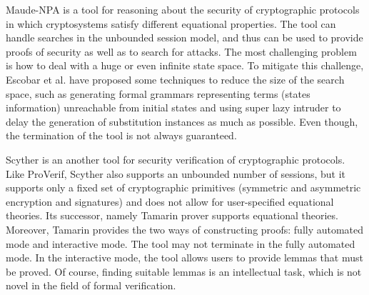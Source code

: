 \documentclass[a4paper,fleqn]{cas-dc}
\begin{document}
Maude-NPA \cite{maudenpa} is a tool for reasoning about the security of cryptographic protocols in which cryptosystems satisfy different equational properties.
The tool can handle searches in the unbounded session model, and thus can be used to provide proofs of security as well as to search for attacks.
The most challenging problem is how to deal with a huge or even infinite state space.
To mitigate this challenge, Escobar et al. \cite{maudenpa08} have proposed some techniques to reduce the size of the search space, such as generating formal grammars representing terms (states information) unreachable from initial states and using super lazy intruder to delay the generation of substitution instances as much as possible.
Even though, the termination of the tool is not always guaranteed.

Scyther \cite{Scyther08} is an another tool for security verification of cryptographic protocols.
Like ProVerif, Scyther also supports an unbounded number of sessions, but it supports only a fixed set of cryptographic primitives (symmetric and asymmetric encryption and signatures) and does not allow for user-specified equational theories.
Its successor, namely Tamarin prover \cite{tamarin} supports equational theories.
Moreover, Tamarin  provides the two ways of constructing proofs: fully automated mode and interactive mode. 
The tool may not terminate in the fully automated mode.
In the interactive mode, the tool allows users to provide lemmas that must be proved. 
Of course, finding suitable lemmas is an intellectual task, which is not novel in the field of formal verification.
\end{document}
